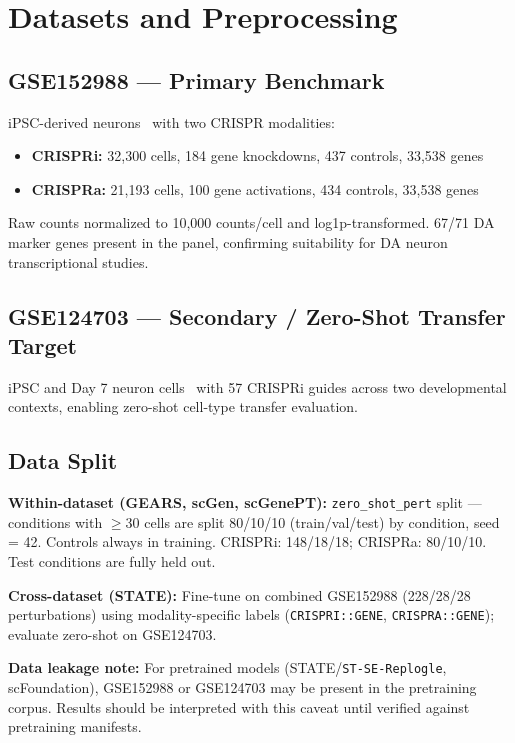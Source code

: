 \documentclass[11pt,letterpaper]{article}
\begin{document}
\section{Datasets and Preprocessing}

\subsection*{GSE152988 --- Primary Benchmark}

iPSC-derived neurons~\cite{tian2021} with two CRISPR modalities:
\begin{itemize}[noitemsep]
  \item \textbf{CRISPRi:} 32,300 cells, 184 gene knockdowns, 437 controls, 33,538 genes
  \item \textbf{CRISPRa:} 21,193 cells, 100 gene activations, 434 controls, 33,538 genes
\end{itemize}
Raw counts normalized to 10,000 counts/cell and log1p-transformed. 67/71 DA marker genes
present in the panel, confirming suitability for DA neuron transcriptional studies.

\subsection*{GSE124703 --- Secondary / Zero-Shot Transfer Target}

iPSC and Day 7 neuron cells~\cite{tian2019} with 57 CRISPRi guides across two developmental
contexts, enabling zero-shot cell-type transfer evaluation.

\subsection*{Data Split}

\textbf{Within-dataset (GEARS, scGen, scGenePT):} \texttt{zero\_shot\_pert} split --- conditions
with $\geq$30 cells are split 80/10/10 (train/val/test) by condition, seed = 42. Controls always
in training. CRISPRi: 148/18/18; CRISPRa: 80/10/10. Test conditions are fully held out.

\textbf{Cross-dataset (STATE):} Fine-tune on combined GSE152988 (228/28/28 perturbations) using
modality-specific labels (\texttt{CRISPRI::GENE}, \texttt{CRISPRA::GENE}); evaluate zero-shot on
GSE124703.

\textbf{Data leakage note:} For pretrained models (STATE/\texttt{ST-SE-Replogle}, scFoundation),
GSE152988 or GSE124703 may be present in the pretraining corpus. Results should be interpreted
with this caveat until verified against pretraining manifests.
\end{document}
